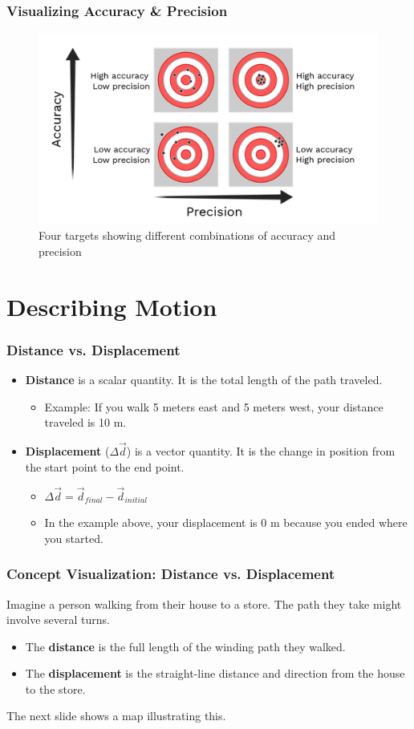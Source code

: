 \documentclass{beamer}
\begin{document}
\begin{frame}
\frametitle{Visualizing Accuracy \& Precision}
\begin{figure}
    \centering
    \includegraphics[width=0.8\linewidth]{phys11-accuracy-precision-targets.png}
    \caption{Four targets showing different combinations of accuracy and precision}
\end{figure}
\end{frame}

\section{Describing Motion}

\begin{frame}
\frametitle{Distance vs. Displacement}
\begin{itemize}
    \item \textbf{Distance} is a \alert{scalar} quantity. It is the total length of the path traveled.
    \pause
    \begin{itemize}
        \item Example: If you walk 5 meters east and 5 meters west, your distance traveled is 10 m.
    \end{itemize}
    \pause
    \item \textbf{Displacement} ($\Delta\vec{d}$) is a \alert{vector} quantity. It is the change in position from the start point to the end point.
    \pause
    \begin{itemize}
        \item $\Delta\vec{d} = \vec{d}_{final} - \vec{d}_{initial}$
        \pause
        \item In the example above, your displacement is 0 m because you ended where you started.
    \end{itemize}
\end{itemize}
\end{frame}

\begin{frame}
\frametitle{Concept Visualization: Distance vs. Displacement}
Imagine a person walking from their house to a store. The path they take might involve several turns.
\begin{itemize}
    \item The \textbf{distance} is the full length of the winding path they walked.
    \item The \textbf{displacement} is the straight-line distance and direction from the house to the store.
\end{itemize}
The next slide shows a map illustrating this.
\end{frame}
\end{document}
